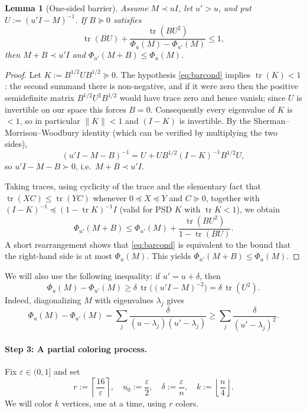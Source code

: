 \documentclass{article}
\newtheorem{lemma}{Lemma}[section]
\begin{document}
\begin{lemma}[One-sided barrier]\label{lem:barrier}
Assume $M \prec uI$, let $u' > u$, and put $U := (u'I - M)^{-1}$. If $B \succeq 0$ satisfies
\begin{equation}
  \operatorname{tr}(BU) + \frac{\operatorname{tr}(BU^2)}{\Phi_u(M) - \Phi_{u'}(M)} \le 1, \label{eq:barcond}
\end{equation}
then $M + B \prec u'I$ and $\Phi_{u'}(M + B) \le \Phi_u(M)$.
\end{lemma}

\begin{proof}
Let $K := B^{1/2} U B^{1/2} \succeq 0$. The hypothesis \eqref{eq:barcond} implies $\operatorname{tr}(K) < 1$:
the second summand there is non-negative, and if it were zero then the positive semidefinite
matrix $B^{1/2} U^2 B^{1/2}$ would have trace zero and hence vanish; since $U$ is invertible on
our space this forces $B = 0$. Consequently every eigenvalue of $K$ is $< 1$, so in particular
$\|K\| < 1$ and $(I - K)$ is invertible. By the Sherman--Morrison--Woodbury identity (which
can be verified by multiplying the two sides),
\[
  (u'I - M - B)^{-1} = U + U B^{1/2}(I - K)^{-1} B^{1/2} U,
\]
so $u'I - M - B \succ 0$, i.e.\ $M + B \prec u'I$.

Taking traces, using cyclicity of the trace and the elementary fact that $\operatorname{tr}(XC) \le \operatorname{tr}(YC)$
whenever $0 \preceq X \preceq Y$ and $C \succeq 0$, together with $(I-K)^{-1} \preceq (1 - \operatorname{tr} K)^{-1} I$
(valid for PSD $K$ with $\operatorname{tr} K < 1$), we obtain
\[
  \Phi_{u'}(M+B) \le \Phi_{u'}(M) + \frac{\operatorname{tr}(BU^2)}{1 - \operatorname{tr}(BU)}.
\]
A short rearrangement shows that \eqref{eq:barcond} is equivalent to the bound that the
right-hand side is at most $\Phi_u(M)$. This yields $\Phi_{u'}(M+B) \le \Phi_u(M)$.
\end{proof}

We will also use the following inequality: if $u' = u + \delta$, then
\begin{equation}
  \Phi_u(M) - \Phi_{u'}(M) \ge \delta\, \operatorname{tr}\!\bigl((u'I - M)^{-2}\bigr) = \delta\, \operatorname{tr}(U^2). \label{eq:drop}
\end{equation}
Indeed, diagonalizing $M$ with eigenvalues $\lambda_j$ gives
\[
  \Phi_u(M) - \Phi_{u'}(M) = \sum_j \frac{\delta}{(u - \lambda_j)(u' - \lambda_j)}
  \ge \sum_j \frac{\delta}{(u' - \lambda_j)^2}.
\]

\paragraph{Step 3: A partial coloring process.}
Fix $\varepsilon \in (0,1]$ and set
\begin{equation}
  r := \left\lceil \frac{16}{\varepsilon} \right\rceil, \quad
  u_0 := \frac{\varepsilon}{2}, \quad
  \delta := \frac{\varepsilon}{n}, \quad
  k := \left\lfloor \frac{n}{4} \right\rfloor. \label{eq:params}
\end{equation}
We will color $k$ vertices, one at a time, using $r$ colors.
\end{document}
